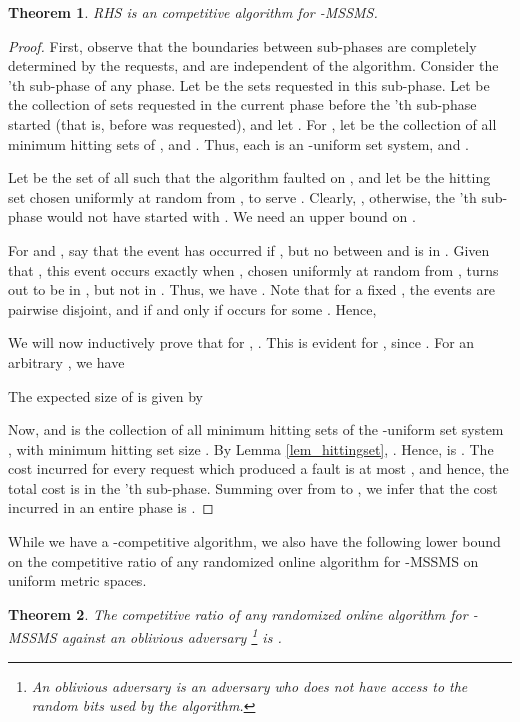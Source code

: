 \documentclass[11pt]{article}
\theoremstyle{plain}\newtheorem{theorem}{Theorem}
\theoremstyle{definition}
\theoremstyle{remark}
\begin{document}
\begin{theorem}
RHS is an  competitive algorithm for -MSSMS.
\end{theorem}

\begin{proof}
First, observe that the boundaries between sub-phases are completely determined by the requests, and are independent of the algorithm. Consider the 'th sub-phase of any phase. Let  be the sets requested in this sub-phase. Let  be the collection of sets requested in the current phase before the 'th sub-phase started (that is, before  was requested), and let . For , let  be the collection of all minimum hitting sets of , and . Thus, each  is an -uniform set system, and .

Let  be the set of all  such that the algorithm faulted on , and let  be the hitting set chosen uniformly at random from , to serve . Clearly, , otherwise, the 'th sub-phase would not have started with . We need an upper bound on . 

For  and , say that the event  has occurred if , but no  between  and  is in . Given that , this event occurs exactly when , chosen uniformly at random from , turns out to be in , but not in . Thus, we have . Note that for a fixed , the events  are pairwise disjoint, and  if and only if  occurs for some . Hence,


We will now inductively prove that for , . This is evident for , since . For an arbitrary , we have


The expected size of  is given by

Now,  and  is the collection of all minimum hitting sets of the -uniform set system , with minimum hitting set size . By Lemma \ref{lem_hittingset}, . Hence,  is . The cost incurred for every request which produced a fault is at most , and hence, the total cost is  in the 'th sub-phase. Summing over  from  to , we infer that the cost incurred in an entire phase is .
\end{proof}

While we have a -competitive algorithm, we also have the following lower bound on the competitive ratio of any randomized online algorithm for -MSSMS on uniform metric spaces.

\begin{theorem}\label{thm_rand_lb}
The competitive ratio of any randomized online algorithm for -MSSMS against an oblivious adversary \footnote{An oblivious adversary is an adversary who does not have access to the random bits used by the algorithm.} is .
\end{theorem}
\end{document}
